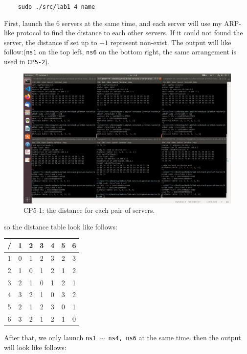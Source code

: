 \documentclass[11pt]{article}
\begin{document}
	\begin{lstlisting}
	sudo ./src/lab1 4 name
	\end{lstlisting}
	
		\par First, launch the $6$ servers at the same time, and each server will use my ARP-like protocol to find the distance to each other servers. If it could not found the server, the distance if set up to $-1$ represent non-exist. The output will like follow:(\texttt{ns1} on the top left, \texttt{ns6} on the bottom right, the same arrangement is used in \texttt{CP5-2}).
		
		\begin{figure}[htbp]
			\centering
			\includegraphics[width=0.9\linewidth]{../lab-netstack-premium-master/checkpoints/CP5-1.png}
			\caption{CP5-1: the distance for each pair of servers.}
			\label{fig:CP5-1}
		\end{figure}
		
		\par so the distance table look like follows:
		
		\begin{tabular}{|c|c|c|c|c|c|c|}
			\hline /&1&2&3&4&5&6\\
			\hline 1&0&1&2&3&2&3\\
			\hline 2&1&0&1&2&1&2\\
			\hline 3&2&1&0&1&2&1\\
			\hline 4&3&2&1&0&3&2\\
			\hline 5&2&1&2&3&0&1\\
			\hline 6&3&2&1&2&1&0\\
			\hline
		\end{tabular}
		
		\par After that, we only launch \texttt{ns1 $\sim$ ns4, ns6} at the same time. then the output will look like follows:
		
\end{document}
